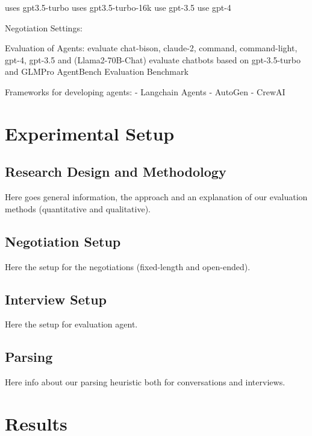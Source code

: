 \documentclass[runningheads]{llncs}
\begin{document}
\cite{park_generative_2023} uses gpt3.5-turbo
\cite{qian_communicative_2023} uses gpt3.5-turbo-16k
\cite{tornberg_simulating_2023} use gpt-3.5
\cite{huang_benchmarking_2023} use gpt-4

Negotiation Settings:

Evaluation of Agents:
\cite{davidson_evaluating_2024} evaluate chat-bison, claude-2, command, command-light, gpt-4, gpt-3.5 and (Llama2-70B-Chat)
\cite{wang_rolellm_2023} evaluate chatbots based on gpt-3.5-turbo and GLMPro
\cite{liu_agentbench_2023} AgentBench Evaluation Benchmark

Frameworks for developing agents:
- Langchain Agents
- AutoGen
- CrewAI





\section{Experimental Setup}

\subsection{Research Design and Methodology}

Here goes general information, the approach and an explanation of our evaluation methods (quantitative and qualitative).

\subsection{Negotiation Setup}

Here the setup for the negotiations (fixed-length and open-ended).

\subsection{Interview Setup}

Here the setup for evaluation agent.

\subsection{Parsing}

Here info about our parsing heuristic both for conversations and interviews.

\section{Results}
\end{document}

